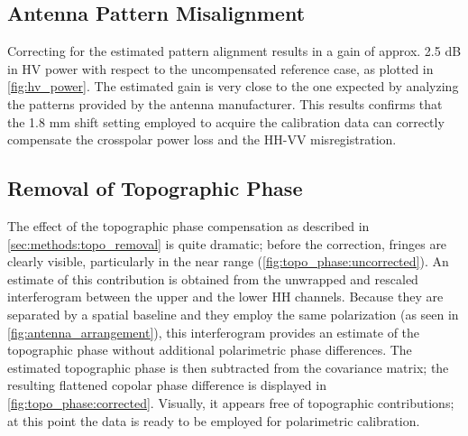 \subsection{Antenna Pattern Misalignment}\label{sec:discussion:misalignment}
Correcting for the estimated pattern alignment results in a gain of approx. 2.5 dB  in HV power with respect to the uncompensated reference case, as plotted in \autoref{fig:hv_power}. The estimated gain is very close to the one expected by analyzing the patterns provided by the antenna manufacturer. This results confirms that the 1.8 mm shift setting employed to acquire the calibration data can correctly compensate the crosspolar power loss and the HH-VV misregistration.
\subsection{Removal of Topographic Phase}
The effect of the topographic phase compensation as described in \autoref{sec:methods:topo_removal} is quite dramatic;
before the correction, fringes are clearly visible, particularly in the near range (\autoref{fig:topo_phase:uncorrected}). An estimate of this contribution is obtained from the unwrapped and rescaled interferogram between the upper and the lower HH channels. Because they are separated by a spatial baseline and they employ the same polarization (as seen in \autoref{fig:antenna_arrangement}), this interferogram provides an estimate of the topographic phase without additional polarimetric phase differences. The estimated topographic phase is then subtracted from the covariance matrix; the resulting flattened copolar phase difference is displayed in \autoref{fig:topo_phase:corrected}. Visually, it appears free of topographic contributions; at this point the data is ready to be employed for polarimetric calibration.
